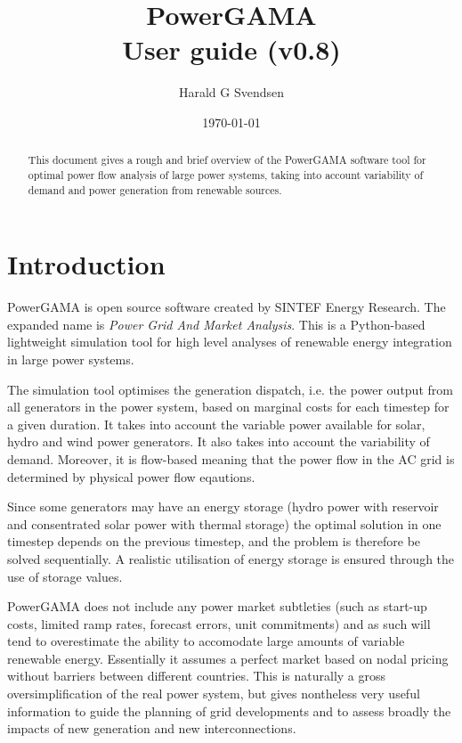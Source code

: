 \documentclass{article}
\title{PowerGAMA\\User guide (v0.8)}
\author{Harald G Svendsen}
\date{\today}
\begin{document}
\maketitle

\begin{abstract}
This document gives a rough and brief overview of the PowerGAMA software tool for optimal power flow analysis of large power systems, taking into account variability of demand and power generation from renewable sources.
\end{abstract}

\tableofcontents


\newpage
\section{Introduction}
PowerGAMA is open source software created by SINTEF Energy Research. The expanded name is \emph{Power Grid And Market Analysis}. This is a Python-based  lightweight simulation tool for high level analyses of renewable energy integration in large power systems.

The simulation tool optimises the generation dispatch, i.e. the power output from all generators in the power system, based on marginal costs for each timestep for a given duration.  It takes into account the variable power available for solar, hydro and wind power generators. It also takes into account the variability of demand. Moreover, it is flow-based meaning that the power flow in the AC grid is determined by physical power flow eqautions. 

Since some generators may have an energy storage (hydro power with reservoir and consentrated solar power with thermal storage) the optimal solution in one timestep depends on the previous timestep, and the problem is  therefore be solved sequentially.  A realistic utilisation of energy storage is ensured through the use of storage values.


PowerGAMA does not include any power market subtleties (such as start-up costs, limited ramp rates, forecast errors, unit commitments) and as such will tend to overestimate the ability to accomodate large amounts of variable renewable energy. Essentially it assumes a perfect market based on nodal pricing without barriers between different countries. This is naturally a gross oversimplification of the real power system, but gives nontheless very useful information to guide the planning of grid developments and to assess broadly the impacts of new generation and new interconnections.
\end{document}

